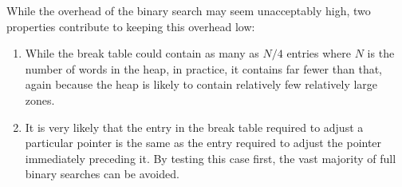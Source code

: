 While the overhead of the binary search may seem unacceptably high,
two properties contribute to keeping this overhead low:

\begin{enumerate}
\item While the break table could contain as many as $N/4$ entries
  where $N$ is the number of words in the heap, in practice, it
  contains far fewer than that, again because the heap is likely to
  contain relatively few relatively large zones.
\item It is very likely that the entry in the break table required to
  adjust a particular pointer is the same as the entry required to
  adjust the pointer immediately preceding it.  By testing this case
  first, the vast majority of full binary searches can be avoided.
\end{enumerate}
